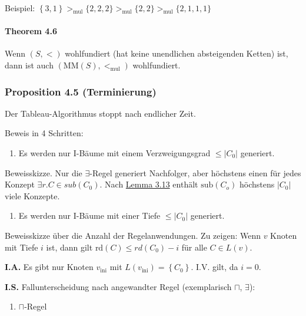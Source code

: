 Beispiel:
$\left\{ 3,1 \right\} >_{\text{mul}}\{ 2,2,2\} >_{\text{mul}}\{ 2,2\} >_{\text{mul}}\{ 2,1,1,1\}$

\paragraph{Theorem 4.6}\label{theorem-4.6}

Wenn $\left( S, < \right)$ wohlfundiert (hat keine unendlichen
absteigenden Ketten) ist, dann ist auch
$\left( \text{MM}\left( S \right), <_{\text{mul}} \right)$
wohlfundiert.

\hypertarget{proposition-4.5-terminierung}{\subsubsection{Proposition
4.5 (Terminierung)}\label{proposition-4.5-terminierung}}

Der Tableau-Algorithmus stoppt nach endlicher Zeit.

Beweis in 4 Schritten:

\begin{enumerate}
\def\labelenumi{\arabic{enumi}.}
\item
  Es werden nur I-Bäume mit einem Verzweigungsgrad
  $\leq \left| C_{0} \right|$ generiert.
\end{enumerate}

Beweisskizze. Nur die $\exists$-Regel generiert Nachfolger, aber
höchstens einen für jedes Konzept $\exists r.C \in sub(C_{0})$. Nach
\protect\hyperlink{lemma-3.13}{Lemma 3.13} enthält
$\text{sub}\left( C_{o} \right)$ höchstens $\left| C_{0} \right|$
viele Konzepte.

\begin{enumerate}
\def\labelenumi{\arabic{enumi}.}
\item
  Es werden nur I-Bäume mit einer Tiefe $\leq \left| C_{0} \right|$
  generiert.
\end{enumerate}

Beweisskizze über die Anzahl der Regelanwendungen. Zu zeigen: Wenn $v$
Knoten mit Tiefe $i$ ist, dann gilt
$\text{rd}\left( C \right) \leq rd\left( C_{0} \right) - i$ für alle
$C \in L\left( v \right)$.

\textbf{I.A.} Es gibt nur Knoten $v_{\text{ini}}$ mit
$L\left( v_{\text{ini}} \right) = \left\{ C_{0} \right\}$. I.V. gilt,
da $i = 0$.

\textbf{I.S.} Fallunterscheidung nach angewandter Regel (exemplarisch
$\sqcap$, $\exists$):

\begin{enumerate}
\def\labelenumi{\alph{enumi}.}
\item
  $\sqcap$-Regel
\end{enumerate}


